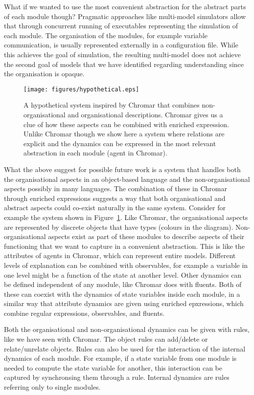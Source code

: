\documentclass[phd]{infthesis}
\begin{document}
What if we wanted to use the most convenient abstraction for the abstract parts
of each module though? Pragmatic approaches like multi-model simulators
\citep{erbm_mois_2015,cis_2018} allow that through concurrent running of
executables representing the simulation of each module. The organisation of the
modules, for example variable communication, is usually represented externally
in a configuration file. While this achieves the goal of simulation, the
resulting multi-model does not achieve the second goal of models that we have
identified regarding understanding since the organisation is opaque.

\begin{figure}[p]
  \centering
  \texttt{[image: figures/hypothetical.eps]}
  \caption{A hypothetical system inspired by Chromar that combines
    non-organisational and organisational descriptions. Chromar gives us a clue
    of how these aspects can be combined with enriched expression. Unlike
    Chromar though we show here a system where relations are explicit and the
    dynamics can be expressed in the most relevant abstraction in each module
    (agent in Chromar).}
    \label{fig:hyp}
\end{figure}

What the above suggest for possible future work is a system that handles both
the organisational aspects in an object-based language and the
non-organisational aspects possibly in many languages. The combination of these
in Chromar through enriched expressions suggests a way that both organisational
and abstract aspects could co-exist naturally in the same system. Consider for
example the system shown in Figure~\ref{fig:hyp}. Like Chromar, the
organisational aspects are represented by discrete objects that have types
(colours in the diagram). Non-organisational aspects exist as part of these
modules to describe aspects of their functioning that we want to capture in a
convenient abstraction. This is like the attributes of agents in Chromar, which
can represent entire models. Different levels of explanation can be combined
with observables, for example a variable in one level might be a function of the
state at another level. Other dynamics can be defined independent of any module,
like Chromar does with fluents. Both of these can coexist with the dynamics of
state variables inside each module, in a similar way that attribute dynamics are
given using enriched epxressions, which combine regular expressions,
observables, and fluents.

Both the organisational and non-organisational dynamics can be given with rules,
like we have seen with Chromar. The object rules can add/delete or
relate/unrelate objects. Rules can also be used for the interaction of the
internal dynamics of each module. For example, if a state variable from one
module is needed to compute the state variable for another, this interaction can
be captured by synchronsing them through a rule. Internal dynamics are rules
referring only to single modules.
\end{document}
